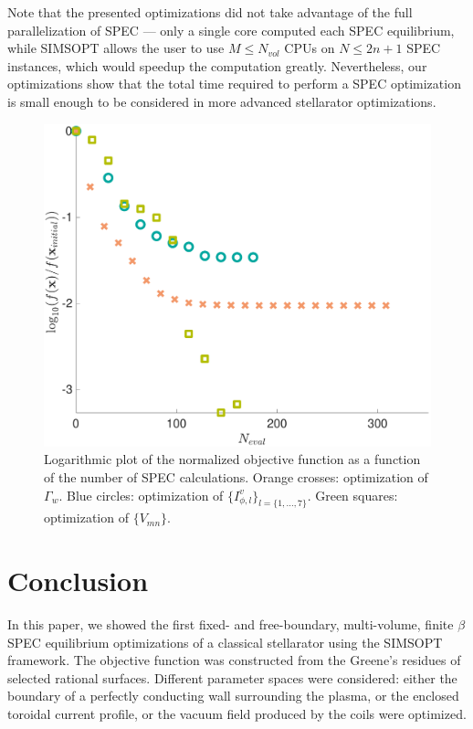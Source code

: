 Note that the presented optimizations did not take advantage of the full parallelization of \ac{SPEC} --- only a single core computed each \ac{SPEC} equilibrium, while SIMSOPT allows the user to use $M\le N_{vol}$ \acp{CPU} on $N\le 2n+1$ \ac{SPEC} instances, which would speedup the computation greatly. Nevertheless, our optimizations show that the total time required to perform a SPEC optimization is small enough to be considered in more advanced stellarator optimizations.

\begin{figure}
    \centering
    \includegraphics[width=.45\textwidth]{main/Figures_Optimization/ObjectiveFunction.pdf}
    \caption{Logarithmic plot of the normalized objective function as a function of the number of \ac{SPEC} calculations. Orange crosses: optimization of $\Gamma_w$. Blue circles: optimization of $\{I^v_{\phi,l}\}_{l=\{1,\ldots,7\}}$. Green squares: optimization of $\{V_{mn}\}$.}
    \label{fig:objective_function}
\end{figure}



\section{Conclusion}

In this paper, we showed the first fixed- and free-boundary, multi-volume, finite $\beta$ \ac{SPEC} equilibrium optimizations of a classical stellarator using the SIMSOPT framework. The objective function was constructed from the Greene's residues of selected rational surfaces. Different parameter spaces were considered: either the boundary of a perfectly conducting wall surrounding the plasma, or the enclosed toroidal current profile, or the vacuum field produced by the coils were optimized. 


